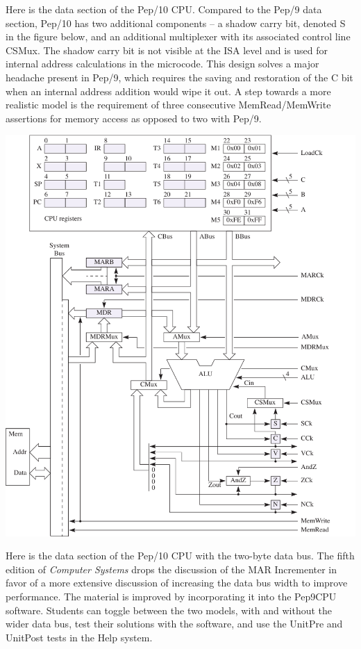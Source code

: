 \documentclass[10pt,fleqn]{book}
\begin{document}
\newpage

\noindent Here is the data section of the Pep/10 CPU.
Compared to the Pep/9 data section, Pep/10 has two additional components -- a shadow carry bit, denoted S in the figure below, and an additional multiplexer with its associated control line CSMux.
The shadow carry bit is not visible at the ISA level and is used for internal address calculations in the microcode.
This design solves a major headache present in Pep/9, which requires the saving and restoration of the C bit when an internal address addition would wipe it out.
A step towards a more realistic model is the requirement of three consecutive MemRead/MemWrite assertions for memory access as opposed to two with Pep/9.\\
\begin{center}
\includegraphics{pep9cpu.pdf}
\end{center}

\newpage

\noindent Here is the data section of the Pep/10 CPU with the two-byte data bus.
The fifth edition of \textit{Computer Systems} drops the discussion of the MAR Incrementer in favor of a more extensive discussion of increasing the data bus width to improve performance.
The material is improved by incorporating it into the Pep9CPU software.
Students can toggle between the two models, with and without the wider data bus, test their solutions with the software, and use the UnitPre and UnitPost tests in the Help system.
\end{document}
